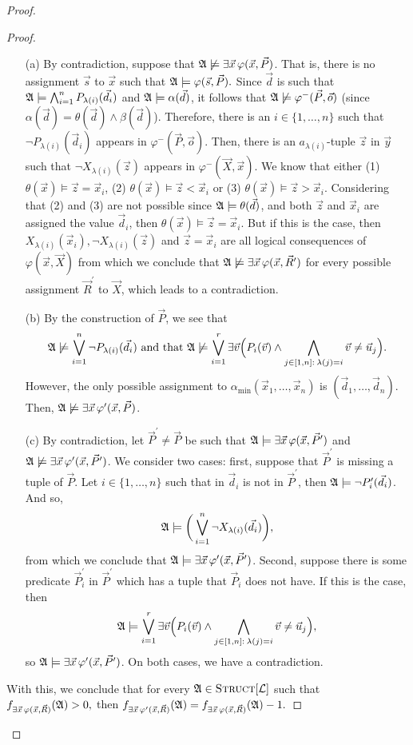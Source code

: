 \documentclass[12pt]{article}
\def\Truc{\textsc{Struct}[\L]}
\def\A{{\frak A}}
\def\L{{\cal L}}
\def\P{\vec{P}}
\def\R{\vec{R}}
\def\X{\vec{X}}
\def\d{\vec{d}} %
\def\s{\vec{s}}
\def\u{\vec{u}} %
\def\v{\vec{v}} %
\def\x{\vec{x}} %
\def\y{\vec{y}} %
\def\z{\vec{z}} %
\def\ep{\vec{o}}
\begin{document}
\begin{proof}
\begin{enumerate}
\begin{proof}
\begin{enumerate}
\item[(a)] By contradiction, suppose that $\A\not\models\exists\x\,\varphi(\x,\P)$. That is, there is no assignment $\s$ to $\x$ such that $\A\models\varphi(\s,\P).$ Since $\d$ is such that $\A\models \bigwedge_{i=1}^n P_{\lambda(i)}(\d_i)$ and $\A\models \alpha(\d)$, it follows that $\A\not\models\varphi^{-}(\P,\ep)$ (since $\alpha(\d)=\theta(\d)\wedge\beta(\d)$). Therefore, there is an $i\in\{1,\ldots,n\}$ such that $\neg P_{\lambda(i)}(\d_i)$ appears in $\varphi^{-}(\P,\ep)$. Then, there is an $a_{\lambda(i)}$-tuple $\z$ in $\y$ such that $\neg X_{\lambda(i)}(\z)$ appears in $\varphi^{-}(\X,\x)$. We know that either (1) $\theta(\x)\models \z = \x_i$, (2) $\theta(\x)\models \z < \x_i$ or (3) $\theta(\x)\models \z > \x_i$. Considering that (2) and (3) are not possible since $\A\models\theta(\d)$, and both $\z$ and $\x_i$ are assigned the value $\d_i$, then $\theta(\x)\models \z = \x_i$. But if this is the case, then $X_{\lambda(i)}(\x_i), \neg X_{\lambda(i)}(\z)$ and $\z = \x_i$ are all logical consequences of $\varphi(\x,\X)$ from which we conclude that $\A\not\models\exists\x\,\varphi(\x,\R^\prime)$ for every possible assignment $\R^\prime$ to $\X$, which leads to a contradiction.
\item[(b)] By the construction of $\P$, we see that 
$$\A\not\models\bigvee_{i = 1}^{n}\neg P_{\lambda(i)}(\d_i) \text{ and that } \A\not\models\bigvee_{i=1}^r \exists \v\Big( P_i(\v) \wedge \bigwedge_{j\in[1,n]:\: \lambda(j) = i} \v \neq \u_j\Big).$$ However, the only possible assignment to $\alpha_{\min}(\x_1,\dots,\x_n)$ is $(\d_1,\dots,\d_n)$. Then, $\A\not\models\exists\x\,\varphi^\prime(\x,\P)$.
\item[(c)] By contradiction, let $\P^\prime \neq \P$ be such that $\A\models\exists\x\,\varphi(\x,\P^\prime)$ and $\A\not\models\exists\x\,\varphi^\prime(\x,\P^\prime)$. We consider two cases: first, suppose that $\P^\prime$ is missing a tuple of $\P$. Let $i\in\{1,\ldots,n\}$ such that in $\d_i$ is not in $\P^\prime$, then $\A\models \neg P^\prime_i(\d_i)$. And so,$$\A\models \bigg(\bigvee_{i = 1}^{n}\neg X_{\lambda(i)}(\d_i) \bigg), $$ from which we conclude that $\A\models\exists\x\,\varphi^\prime(\x,\P^\prime)$. Second, suppose there is some predicate $\P^\prime_i$ in $\P^\prime$ which has a tuple that $\P_i$ does not have. If this is the case, then $$\A\models\bigvee_{i=1}^r \exists \v\Big( P_i(\v) \wedge \bigwedge_{j\in[1,n]:\: \lambda(j) = i} \v \neq \u_j\Big),$$ so $\A\models\exists\x\,\varphi^\prime(\x,\P^\prime)$. On both cases, we have a contradiction.
\end{enumerate}
With this, we conclude that for every $\A\in\Truc$ such that $f_{\exists\x\,\varphi(\x,\R)}(\A)>0,$ then $f_{\exists\x\,\varphi^\prime(\x,\R)}(\A) = f_{\exists\x\,\varphi(\x,\R)}(\A)-1.$


\end{proof}
\end{enumerate}
\end{proof}
\end{document}
